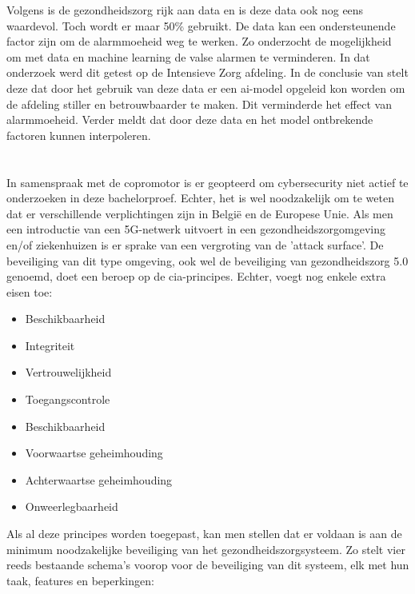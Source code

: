 Volgens \textcite{Niekerk2020} is de gezondheidszorg rijk aan data en is deze data ook nog eens waardevol. Toch wordt er maar 50\% gebruikt.
De data kan een ondersteunende factor zijn om de alarmmoeheid weg te werken. Zo onderzocht \textcite{Hever2019} de mogelijkheid om met data en machine learning de valse alarmen te verminderen. In dat onderzoek werd dit getest op de Intensieve Zorg afdeling. In de conclusie van \textcite{Hever2019} stelt deze dat door het gebruik van deze data er een \gls{ai}-model opgeleid kon worden om de afdeling stiller en betrouwbaarder te maken. Dit verminderde het effect van alarmmoeheid. Verder meldt \textcite{Hever2019} dat door deze data en het model  ontbrekende factoren kunnen interpoleren.

\section{}%
\label{sec:security}%

In samenspraak met de copromotor is er geopteerd om cybersecurity niet actief te onderzoeken in deze bachelorproef. Echter, het is wel noodzakelijk om te weten dat er verschillende verplichtingen zijn in België en de Europese Unie. Als men een introductie van een 5G-netwerk uitvoert in een gezondheidszorgomgeving en/of ziekenhuizen is er sprake van een vergroting van de 'attack surface'. De beveiliging van dit type omgeving, ook wel de beveiliging van gezondheidszorg 5.0 genoemd, doet een beroep op de \gls{cia}-principes. Echter, \textcite{Wazid2022} voegt nog enkele extra eisen toe:

\begin{itemize}
  \item Beschikbaarheid
  \item Integriteit
  \item Vertrouwelijkheid
  \item Toegangscontrole
  \item Beschikbaarheid
  \item Voorwaartse geheimhouding
  \item Achterwaartse geheimhouding
  \item Onweerlegbaarheid
\end{itemize}

Als al deze principes worden toegepast, kan men stellen dat er voldaan is aan de minimum noodzakelijke beveiliging van het gezondheidszorgsysteem. Zo stelt \textcite{Wazid2022} vier reeds bestaande schema's voorop voor de beveiliging van dit systeem, elk met hun taak, features en beperkingen:


